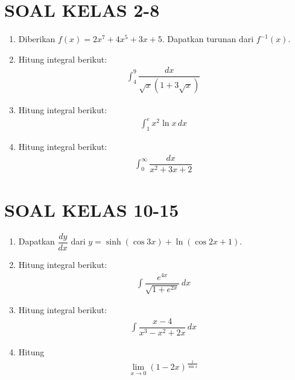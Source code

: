 \documentclass{article}
\begin{document}
\section*{SOAL KELAS 2-8}
\begin{enumerate}
	\item Diberikan $f(x)=2x^7+4x^5+3x+5$. Dapatkan turunan dari $f^{-1}(x)$.
	\item Hitung integral berikut:
	\begin{align*}
	\int_4^9 \dfrac{dx}{\sqrt{x}(1+3\sqrt{x})}
	\end{align*}
	\item Hitung integral berikut:
	\begin{align*}
	\int_1^e x^2\ln x\, dx
	\end{align*}
	\item Hitung integral berikut:
	\begin{align*}
	\int_0^{\infty} \dfrac{dx}{x^2+3x+2}
	\end{align*}
\end{enumerate}
\newpage
\section*{SOAL KELAS 10-15}
\begin{enumerate}
	\item Dapatkan $\dfrac{dy}{dx}$ dari $y=\sinh(\cos 3x)+\ln(\cos 2x+1)$.
	\item Hitung integral berikut:
	\begin{align*}
	\int \dfrac{e^{4x}}{\sqrt{1+e^{2x}}}\, dx
	\end{align*}
	\item Hitung integral berikut:
	\begin{align*}
	\int \dfrac{x-4}{x^3-x^2+2x}\, dx
	\end{align*}
	\item Hitung 
	\begin{align*}
	\lim_{x\rightarrow 0 } (1-2x)^{\frac{1}{\sin x}}
	\end{align*}
\end{enumerate}
\newpage
\end{document}
